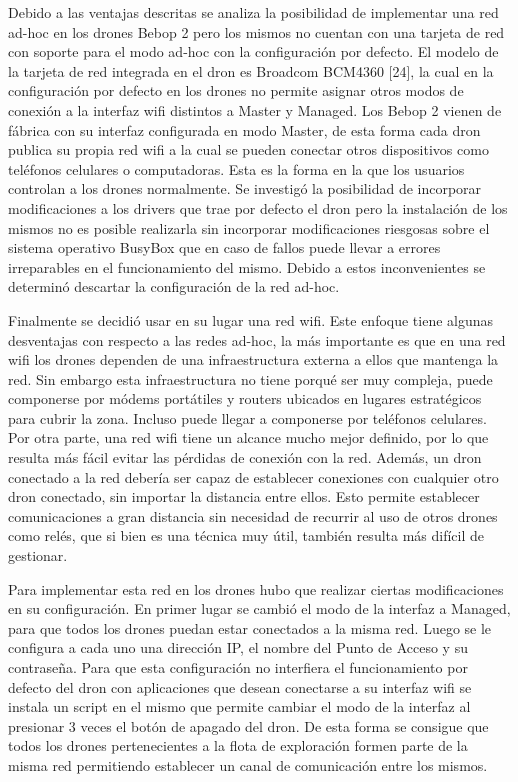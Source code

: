 Debido a las ventajas descritas se analiza la posibilidad de implementar una red ad-hoc en los drones Bebop 2 pero los mismos no cuentan con una  tarjeta de red con soporte para el modo ad-hoc con la configuración por defecto. 
El modelo de la  tarjeta de red integrada en el dron es Broadcom BCM4360 [24], la cual en la configuración por defecto en los drones no permite asignar otros modos de conexión a la interfaz wifi distintos a Master y Managed. Los Bebop 2 vienen de fábrica con su interfaz configurada en modo Master, de esta forma cada dron publica su propia red wifi a la cual se pueden conectar otros dispositivos como teléfonos celulares o computadoras. Esta es la forma en la que los usuarios controlan a los drones normalmente.
Se investigó la posibilidad de incorporar modificaciones a los drivers que trae por defecto el dron pero la instalación de los mismos no es posible realizarla sin incorporar modificaciones riesgosas sobre el sistema operativo BusyBox que en caso de fallos puede llevar a errores irreparables en el funcionamiento del mismo. Debido a estos inconvenientes se determinó descartar la configuración de la red ad-hoc.

Finalmente se decidió usar en su lugar una red wifi. Este enfoque tiene algunas desventajas con respecto a las redes ad-hoc, la más importante es que en una red wifi los drones dependen de una infraestructura externa a ellos que mantenga la red. Sin embargo esta infraestructura no tiene porqué ser muy compleja, puede componerse por módems portátiles y routers ubicados en lugares estratégicos para cubrir la zona. Incluso puede llegar a componerse por teléfonos celulares.
Por otra parte, una red wifi tiene un alcance mucho mejor definido, por lo que resulta más fácil evitar las pérdidas de conexión con la red.
Además, un dron conectado a la red debería ser capaz de establecer conexiones con cualquier otro dron conectado, sin importar la distancia entre ellos. Esto permite establecer comunicaciones a gran distancia sin necesidad de recurrir al uso de otros drones como relés, que si bien es una técnica muy útil, también resulta más difícil de gestionar.

Para implementar esta red en los drones hubo que realizar ciertas modificaciones en su configuración. En primer lugar se cambió el modo de la interfaz a Managed, para que todos los drones puedan estar conectados a la misma red. Luego se le configura a cada uno una dirección IP, el nombre del Punto de Acceso y su contraseña. Para que esta configuración no interfiera el funcionamiento por defecto del dron con aplicaciones que desean conectarse a su interfaz wifi se instala un script en el mismo que permite cambiar el modo de la interfaz al presionar 3 veces el botón de apagado del dron.
De esta forma se consigue que todos los drones pertenecientes a la flota de exploración formen parte de la misma red permitiendo establecer un canal de comunicación entre los mismos.

